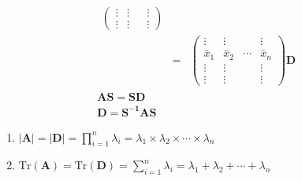 \documentclass[a4paper, 11pt, normalem]{report}
\begin{document}
\begin{gather*}
\begin{aligned}
\begin{pmatrix}
            \vdots & \vdots & & \vdots \\
            \vdots & \vdots & & \vdots
        \end{pmatrix} \\ &=&
        \begin{pmatrix}
            \vdots & \vdots & & \vdots \\
            \bar{x}_1 & \bar{x}_2 & \cdots & \bar{x}_n \\
            \vdots & \vdots & & \vdots \\
            \vdots & \vdots & & \vdots
        \end{pmatrix} \mathbf{D}
    \end{aligned} \\
    \mathbf{AS} = \mathbf{SD} \\
    \mathbf{D} = \mathbf{S^{-1}AS}
\end{gather*}
\begin{enumerate}
    \item $\mathbf{|A|} = \mathbf{|D|} = \prod_{i = 1}^{n} \lambda_i = \lambda_{1} \times \lambda_{2} \times \cdots \times \lambda_{n}$
    \item $\text{Tr}(\mathbf{A}) = \text{Tr}(\mathbf{D}) = \sum_{i = 1}^{n} \lambda_i = \lambda_1 + \lambda_2 + \cdots + \lambda_n$
\end{enumerate}
\end{document}
